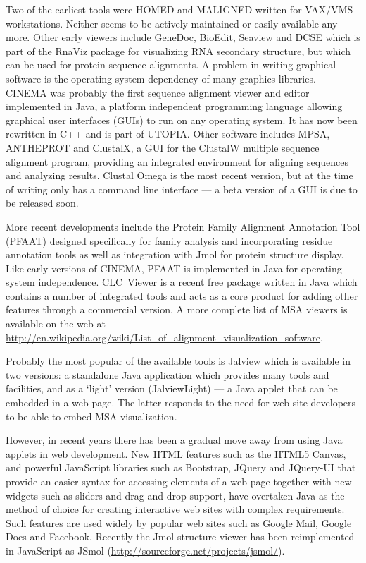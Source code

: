 \documentclass[a4]{article}
\begin{document}
Two of the earliest tools were HOMED\cite{stockwell:homed} and
MALIGNED\cite{clark:maligned} written for VAX/VMS workstations.
Neither seems to be actively maintained or easily available any
more. Other early viewers include GeneDoc\cite{nicholas:genedoc},
BioEdit, Seaview\cite{galtier:seaview} and DCSE\cite{derijk:dcse}
which is part of the RnaViz package for visualizing RNA secondary
structure\cite{derijk:rnaviz}, but which can be used for protein
sequence alignments.  A problem in writing graphical software is the
operating-system dependency of many graphics libraries.
CINEMA\cite{parrysmith:cinema} was probably the first sequence
alignment viewer and editor implemented in Java, a platform
independent programming language allowing graphical user interfaces
(GUIs) to run on any operating system. It has now been rewritten in
C++ and is part of UTOPIA\cite{pettifer:utopia}. Other software
includes MPSA\cite{blanchet:mpsa}, ANTHEPROT\cite{deleage:antheprot}
and ClustalX\cite{thompson:clustalx}, a GUI for the ClustalW multiple
sequence alignment program, providing an integrated environment for
aligning sequences and analyzing results. Clustal Omega is the most
recent version, but at the time of writing only has a command line
interface --- a beta version of a GUI is due to be released soon.

More recent developments include the Protein Family Alignment
Annotation Tool (PFAAT)\cite{johnson:pfaat} designed specifically for
family analysis and incorporating residue annotation tools as well as
integration with Jmol for protein structure display. Like early
versions of CINEMA, PFAAT is implemented in Java for operating system
independence. CLC~Viewer is a recent free package written in Java
which contains a number of integrated tools and acts as a core product
for adding other features through a commercial version.  A more
complete list of MSA viewers is available on the web at
\url{http://en.wikipedia.org/wiki/List_of_alignment_visualization_software}.

Probably the most popular of the available tools is
Jalview\cite{clamp:jalview} which is available in two versions: a
standalone Java application which provides many tools and facilities,
and as a `light' version (JalviewLight) --- a Java applet that can be
embedded in a web page. The latter responds to the need for web site
developers to be able to embed MSA visualization.

However, in recent years there has been a gradual move away from using
Java applets in web development. New HTML features such as the HTML5
Canvas, and powerful JavaScript libraries such as Bootstrap, JQuery
and JQuery-UI that provide an easier syntax for accessing elements of
a web page together with new widgets such as sliders and drag-and-drop
support, have overtaken Java as the method of choice for creating
interactive web sites with complex requirements.  Such features are
used widely by popular web sites such as Google Mail, Google Docs and
Facebook.  Recently the Jmol structure viewer has been reimplemented
in JavaScript as JSmol (\url{http://sourceforge.net/projects/jsmol/}).
\end{document}
